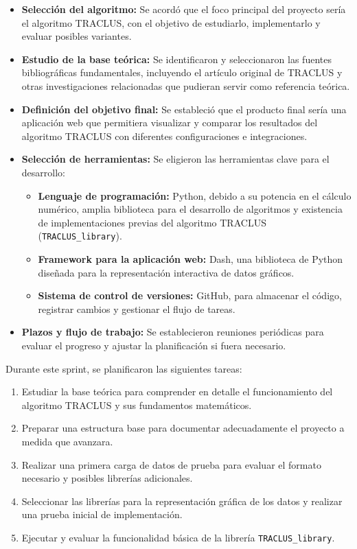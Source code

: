 \begin{itemize}
    \item \textbf{Selección del algoritmo:} Se acordó que el foco principal del proyecto sería el algoritmo TRACLUS, con el objetivo de estudiarlo, implementarlo y evaluar posibles variantes.
    \item \textbf{Estudio de la base teórica:} Se identificaron y seleccionaron las fuentes bibliográficas fundamentales, incluyendo el artículo original de TRACLUS y otras investigaciones relacionadas que pudieran servir como referencia teórica.
    \item \textbf{Definición del objetivo final:} Se estableció que el producto final sería una aplicación web que permitiera visualizar y comparar los resultados del algoritmo TRACLUS con diferentes configuraciones e integraciones.
    \item \textbf{Selección de herramientas:} Se eligieron las herramientas clave para el desarrollo:
        \begin{itemize}
            \item \textbf{Lenguaje de programación:} Python, debido a su potencia en el cálculo numérico, amplia biblioteca para el desarrollo de algoritmos y existencia de implementaciones previas del algoritmo TRACLUS (\texttt{TRACLUS\_library}).
            \item \textbf{Framework para la aplicación web:} Dash, una biblioteca de Python diseñada para la representación interactiva de datos gráficos.
            \item \textbf{Sistema de control de versiones:} GitHub, para almacenar el código, registrar cambios y gestionar el flujo de tareas.
        \end{itemize}
    \item \textbf{Plazos y flujo de trabajo:} Se establecieron reuniones periódicas para evaluar el progreso y ajustar la planificación si fuera necesario.
\end{itemize}

Durante este sprint, se planificaron las siguientes tareas:

\begin{enumerate}
    \item Estudiar la base teórica para comprender en detalle el funcionamiento del algoritmo TRACLUS y sus fundamentos matemáticos.
    \item Preparar una estructura base para documentar adecuadamente el proyecto a medida que avanzara.
    \item Realizar una primera carga de datos de prueba para evaluar el formato necesario y posibles librerías adicionales.
    \item Seleccionar las librerías para la representación gráfica de los datos y realizar una prueba inicial de implementación.
    \item Ejecutar y evaluar la funcionalidad básica de la librería \texttt{TRACLUS\_library}.
\end{enumerate}
